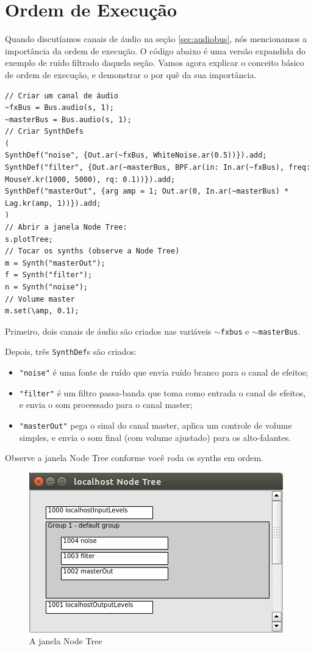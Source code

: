 \section{Ordem de Execução}
\label{sec:order-of-execution}

Quando discutíamos canais de áudio na seção \ref{sec:audiobus}, nós mencionamos a importância da ordem de execução. O código abaixo é uma versão expandida do exemplo de ruído filtrado daquela seção. Vamos agora explicar o conceito básico de ordem de execução, e demonstrar o por quê da sua importância.

\begin{lstlisting}[style=SuperCollider-IDE, basicstyle=\scttfamily\footnotesize]
// Criar um canal de áudio
~fxBus = Bus.audio(s, 1);
~masterBus = Bus.audio(s, 1);
// Criar SynthDefs
(
SynthDef("noise", {Out.ar(~fxBus, WhiteNoise.ar(0.5))}).add;
SynthDef("filter", {Out.ar(~masterBus, BPF.ar(in: In.ar(~fxBus), freq: MouseY.kr(1000, 5000), rq: 0.1))}).add;
SynthDef("masterOut", {arg amp = 1; Out.ar(0, In.ar(~masterBus) * Lag.kr(amp, 1))}).add;
)
// Abrir a janela Node Tree:
s.plotTree;
// Tocar os synths (observe a Node Tree)
m = Synth("masterOut");
f = Synth("filter");
n = Synth("noise");
// Volume master
m.set(\amp, 0.1);
\end{lstlisting}

Primeiro, dois canais de áudio são criados nas variáveis \texttt{$\sim$fxbus} e \texttt{$\sim$masterBus}.

Depois, três \texttt{SynthDef}s são criados:

\begin{itemize}
\item \texttt{"noise"} é uma fonte de ruído que envia ruído branco para o canal de efeitos;
\item \texttt{"filter"} é um filtro passa-banda que toma como entrada o canal de efeitos, e envia o som processado para o canal master;
\item \texttt{"masterOut"} pega o sinal do canal master, aplica um controle de volume simples, e envia o som final (com volume ajustado) para os alto-falantes.
\end{itemize}

Observe a janela Node Tree conforme você roda os synths em ordem.

\begin{figure}[h]
\centerline{
	\includegraphics[scale=0.5]{fig-node-tree.png}}
\caption{A janela Node Tree}
\label{fig:node-tree}
\end{figure}

